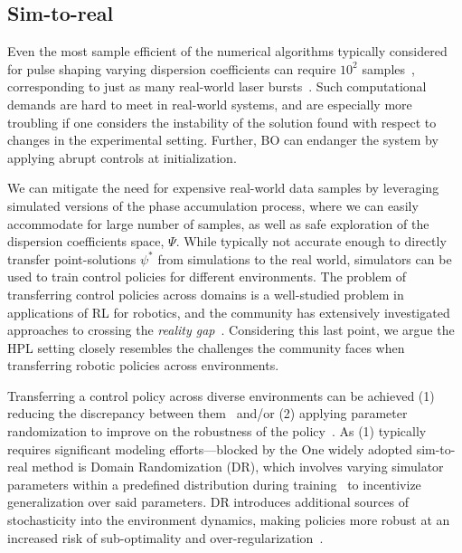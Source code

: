 \subsection{Sim-to-real}
Even the most sample efficient of the numerical algorithms typically considered for pulse shaping varying dispersion coefficients can require $10^2$ samples~\citep{capuano2022laser}, corresponding to just as many real-world laser bursts~\citep{shalloo2020automation}. Such computational demands are hard to meet in real-world systems, and are especially more troubling if one considers the instability of the solution found with respect to changes in the experimental setting. Further, BO can endanger the system by applying abrupt controls at initialization.

We can mitigate the need for expensive real-world data samples by leveraging simulated versions of the phase accumulation process, where we can easily accommodate for large number of samples, as well as safe exploration of the dispersion coefficients space, $\Psi$. While typically not accurate enough to directly transfer point-solutions $\psi^*$ from simulations to the real world, simulators can be used to train control policies for different environments. The problem of transferring control policies across domains is a well-studied problem in applications of RL for robotics, and the community has extensively investigated approaches to crossing the \emph{reality gap}~\citep{tobin2017domain, valassakis2020crossing}. Considering this last point, we argue the HPL setting closely resembles the challenges the community faces when transferring robotic policies across environments. 

Transferring a control policy across diverse environments can be achieved (1) reducing the discrepancy between them~\citep{zhu2017fast} and/or (2) applying parameter randomization to improve on the robustness of the policy~\citep{peng2018sim}. As (1) typically requires significant modeling efforts---blocked by the 
One widely adopted sim-to-real method is Domain Randomization (DR), which involves varying simulator parameters within a predefined distribution during training~\citep{valassakis2020crossing} to incentivize generalization over said parameters. DR introduces additional sources of stochasticity into the environment dynamics, making policies more robust at an increased risk of sub-optimality and over-regularization~\citep{margolis2024rapid}.


